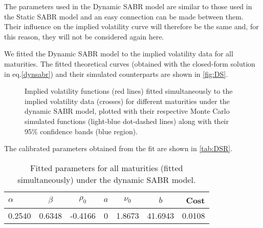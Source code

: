 The parameters used in the Dynamic SABR model are similar to those used in the Static SABR model and an easy connection can be made between them. Their influence on the implied volatility curve will therefore be the same and, for this reason, they will not be considered again here.

We fitted the Dynamic SABR model to the implied volatility data for all maturities. The fitted theoretical curves (obtained with the closed-form solution in eq.\eqref{dynsabr}) and their simulated counterparts are shown in \autoref{fig:DS}.


\vspace{\fill}
\newpage

\begin{figure}[H]
  \begin{subfigmatrix}{2}
  \end{subfigmatrix}
  \caption[Implied volatility functions fitted simultaneously to the implied volatility data for different maturities under the dynamic SABR model, plotted with their respective Monte Carlo simulated functions along with their 95\% confidence bands.]{Implied volatility functions (red lines) fitted simultaneously to the implied volatility data (crosses) for different maturities under the dynamic SABR model, plotted with their respective Monte Carlo simulated functions (light-blue dot-dashed lines) along with their 95\% confidence bands (blue region).}
  \label{fig:DS}
\end{figure}

The calibrated parameters obtained from the fit are shown in \autoref{tab:DSR}.

\begin{table}[H]
    \centering
        \renewcommand{\arraystretch}{0.8}
\begin{tabular}{@{}lcccccr@{}}
\toprule
$\alpha$ & $\beta$ & $\rho_0$ & $a$ & $\nu_0$ & $b$ & Cost \\ \midrule
0.2540 & 0.6348 & -0.4166 & 0 & 1.8673 & 41.6943 & 0.0108 \\
\bottomrule
\end{tabular}
  \caption[Fitted parameters for all maturities (fitted simultaneously) under the dynamic SABR model.]{Fitted parameters for all maturities (fitted simultaneously) under the dynamic SABR model.}
  \label{tab:DSR}
\end{table}


